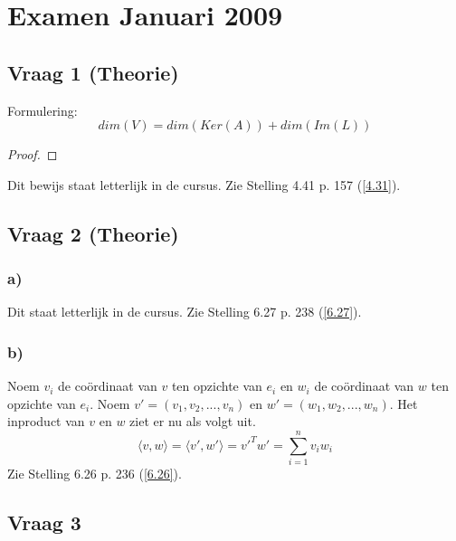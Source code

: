 \documentclass[lineaire_algebra_oplossingen.tex]{subfiles}
\begin{document}
\section{Examen Januari 2009}
\subsection{Vraag 1 (Theorie)}
Formulering:
\[
dim(V) = dim(Ker(A)) + dim(Im(L))
\]
\begin{proof}
\end{proof}
Dit bewijs staat letterlijk in de cursus. Zie Stelling 4.41 p. 157 (\ref{4.31}).

\subsection{Vraag 2 (Theorie)}
\subsubsection*{a)}
Dit staat letterlijk in de cursus. Zie Stelling 6.27 p. 238 (\ref{6.27}).

\subsubsection*{b)}
Noem $v_i$ de co\"ordinaat van $v$ ten opzichte van $e_i$ en $w_i$ de co\"ordinaat van $w$ ten opzichte van $e_i$. Noem $v' = (v_1,v_2,...,v_n)$ en $w' = (w_1,w_2,...,w_n)$. Het inproduct van $v$ en $w$ ziet er nu als volgt uit.
\[
\langle v,w \rangle = \langle v',w' \rangle = v'^Tw' = \sum_{i=1}^nv_iw_i
\]
Zie Stelling 6.26 p. 236 (\ref{6.26}).

\subsection{Vraag 3}
\end{document}
